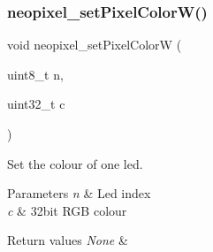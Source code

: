 \subsubsection{\texorpdfstring{neopixel\+\_\+set\+Pixel\+Color\+W()}{neopixel\_setPixelColorW()}}
{\footnotesize\ttfamily void neopixel\+\_\+set\+Pixel\+ColorW (\begin{DoxyParamCaption}\item[{uint8\+\_\+t}]{n,  }\item[{uint32\+\_\+t}]{c }\end{DoxyParamCaption})}



Set the colour of one led. 


\begin{DoxyParams}{Parameters}
{\em n} & Led index \\
\hline
{\em c} & 32bit R\+GB colour \\
\hline
\end{DoxyParams}

\begin{DoxyRetVals}{Return values}
{\em None} & \\
\hline
\end{DoxyRetVals}
